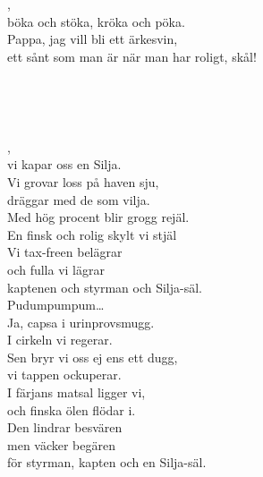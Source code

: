 \\


 \\       
\author{Text: ”Ärkesvinet” Janne Weijnitz }

,\\
böka och stöka, kröka och pöka.\\
Pappa, jag vill bli ett ärkesvin,\\
ett sånt som man är när man har roligt, skål!

\\

\newpage 


 \\       
\author{Text: Martin Johnsson}

,\\
vi kapar oss en Silja.\\
Vi grovar loss på haven sju,\\
dräggar med de som vilja.\\
Med hög procent blir grogg rejäl.\\
En finsk och rolig skylt vi stjäl\\
Vi tax-freen belägrar\\
och fulla vi lägrar\\
kaptenen och styrman och Silja-säl.\\
Pudumpumpum…\\
Ja, capsa i urinprovsmugg.\\
I cirkeln vi regerar.\\
Sen bryr vi oss ej ens ett dugg,\\
vi tappen ockuperar.\\
I färjans matsal ligger vi,\\
och finska ölen flödar i.\\
Den lindrar besvären\\
men väcker begären\\
för styrman, kapten och en Silja-säl.

